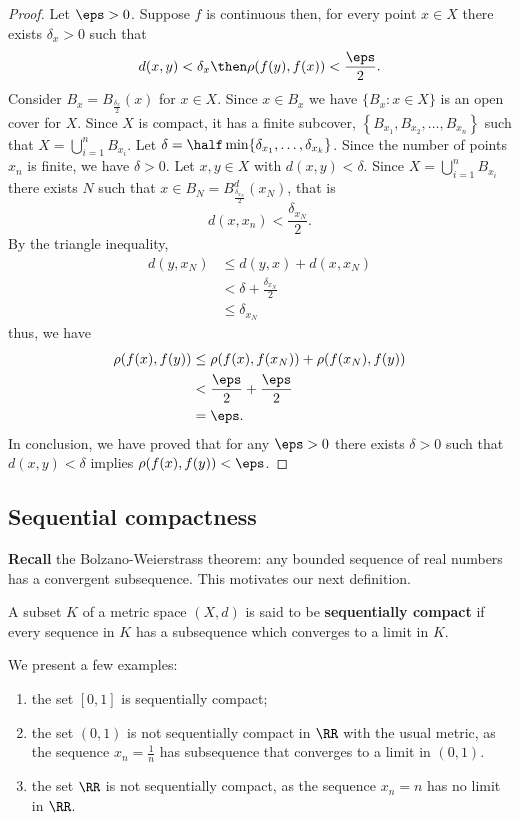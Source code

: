 \documentclass[12pt, a4paper]{article}
\begin{document}
\begin{proof}
    Let \(\eps>0\). Suppose \(f\) is continuous then, for every point \(x \in X\) there exists \(\delta_x >0\) such that 
    \[d(x,y)<\delta_x \then \rho(f(y),f(x))<\frac{\eps}{2}.\]
    Consider \(B_x = B_{\frac{\delta_x}{2}}(x)\) for \(x \in X\). Since \(x \in B_x\) we have \(\{B_x : x \in X\}\) is an open cover for \(X\). Since \(X\) is compact, it has a finite subcover, \(\left\{ B_{x_1},B_{x_2},\ldots,B_{x_n} \right\}\) such that \(X = \bigcup_{i=1}^n B_{x_i}\). Let \(\delta = \half \min\{\delta_{x_1},\ldots, \delta_{x_k}\}\). Since the number of points \(x_n\) is finite, we have \(\delta>0\).
    Let \(x,y \in X\) with \(d(x,y)<\delta\). Since \(X =\bigcup_{i=1}^n B_{x_i}\) there exists \(N\) such that \(x \in B_N = B_{\frac{\delta_{x_N}}{2}}^d(x_N)\), that is 
    \[d(x,x_n)<\frac{\delta_{x_N}}{2}.\]
    By the triangle inequality,
    \[\begin{aligned}
        d(y,x_N) &\leq d(y,x)+d(x,x_N) \\
        &< \delta + \frac{\delta_{x_N}}{2} \\
        &\leq \delta_{x_N}
    \end{aligned}\]
    thus, we have 
    \[\begin{aligned}
        \rho(f(x),f(y)) &\leq \rho(f(x),f(x_N))+\rho(f(x_N),f(y)) \\
        &< \frac{\eps}{2}+\frac{\eps}{2} \\
        &= \eps.
    \end{aligned}\]
    In conclusion, we have proved that for any \(\eps>0\) there exists \(\delta>0\) such that \(d(x,y)<\delta\) implies \(\rho(f(x),f(y))<\eps\).
\end{proof}

\subsection{Sequential compactness}

\textbf{Recall} the Bolzano-Weierstrass theorem: any bounded sequence of real numbers has a convergent subsequence. This motivates our next definition.

\begin{definition}
    A subset \(K\) of a metric space \((X,d)\) is said to be \textbf{sequentially compact} if every sequence in \(K\) has a subsequence which converges to a limit in \(K\).
\end{definition}

\begin{example}
    We present a few examples:
    \begin{enumerate}
        \item the set \([0,1]\) is sequentially compact;
        \item the set \((0,1)\) is not sequentially compact in \(\RR\) with the usual metric, as the sequence \(x_n = \frac{1}{n}\) has subsequence that converges to a limit in \((0,1)\).
        \item the set \(\RR\) is not sequentially compact, as the sequence \(x_n =n\) has no limit in \(\RR\).
    \end{enumerate}
\end{example}
\end{document}
